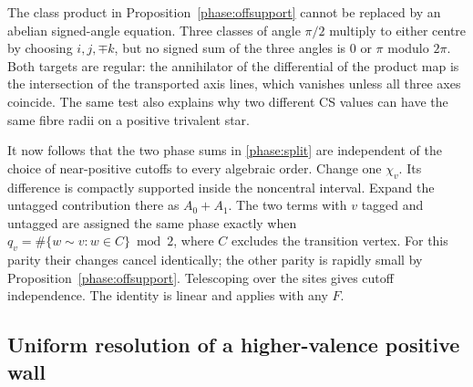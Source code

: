 The class product in Proposition~\ref{phase:offsupport} cannot be replaced by an abelian signed-angle equation. Three classes of angle \(\pi/2\) multiply to either centre by choosing \(i,j,\mp k\), but no signed sum of the three angles is \(0\) or \(\pi\) modulo \(2\pi\). Both targets are regular: the annihilator of the differential of the product map is the intersection of the transported axis lines, which vanishes unless all three axes coincide. The same test also explains why two different CS values can have the same fibre radii on a positive trivalent star.

It now follows that the two phase sums in \eqref{phase:split} are independent of the choice of near-positive cutoffs to every algebraic order. Change one \(\chi_v\). Its difference is compactly supported inside the noncentral interval. Expand the untagged contribution there as \(A_0+A_1\). The two terms with \(v\) tagged and untagged are assigned the same phase exactly when \(q_v=\#\{w\sim v:w\in C\}\bmod2\), where \(C\) excludes the transition vertex. For this parity their changes cancel identically; the other parity is rapidly small by Proposition~\ref{phase:offsupport}. Telescoping over the sites gives cutoff independence. The identity is linear and applies with any \(F\).

\subsection{Uniform resolution of a higher-valence positive wall}
\label{phase:positive-walls}

